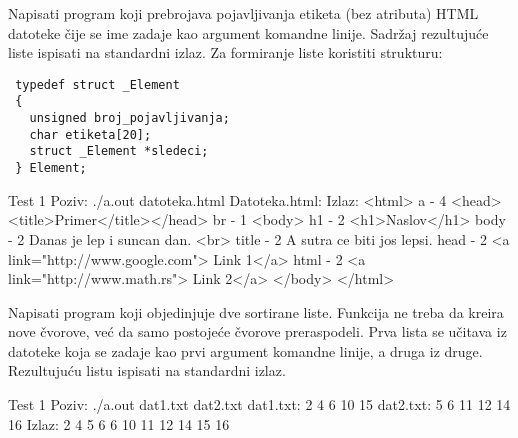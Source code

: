 
\begin{Exercise}[label=606]
Napisati program koji prebrojava pojavljivanja etiketa (bez atributa) HTML 
datoteke čije se ime zadaje kao argument komandne linije. Sadržaj rezultujuće 
liste ispisati na standardni izlaz. Za formiranje liste koristiti strukturu:
\begin{verbatim} 
 typedef struct _Element
 {
   unsigned broj_pojavljivanja;
   char etiketa[20];
   struct _Element *sledeci;
 } Element;
\end{verbatim}

\begin{maxitest}
    \begin{test}{Test 1}
Poziv: ./a.out datoteka.html
Datoteka.html:                                     Izlaz:
<html>                                             a - 4
  <head><title>Primer</title></head>               br - 1
  <body>                                           h1 - 2
    <h1>Naslov</h1>                                body - 2
    Danas je lep i suncan dan. <br>                title - 2
    A sutra ce biti jos lepsi.                     head - 2
    <a link="http://www.google.com"> Link 1</a>    html - 2
    <a link="http://www.math.rs"> Link 2</a>
  </body>
</html>
    \end{test}
\end{maxitest}

\end{Exercise}
\begin{Answer}[ref=606]
\end{Answer}



\begin{Exercise}[label=607]
Napisati program koji objedinjuje dve sortirane liste. Funkcija ne treba da 
kreira nove čvorove, već da samo
postojeće čvorove preraspodeli. Prva lista se učitava iz datoteke koja se 
zadaje kao prvi argument komandne
linije, a druga iz druge. Rezultujuću listu ispisati na standardni izlaz.

\begin{miditest}
  \begin{test}{Test 1}
Poziv: ./a.out dat1.txt dat2.txt
dat1.txt: 2 4 6 10 15
dat2.txt: 5 6 11 12 14 16
Izlaz: 2 4 5 6 6 10 11 12 14 15 16
  \end{test}
\end{miditest}
  
\end{Exercise}
\begin{Answer}[ref=607]
\end{Answer}



